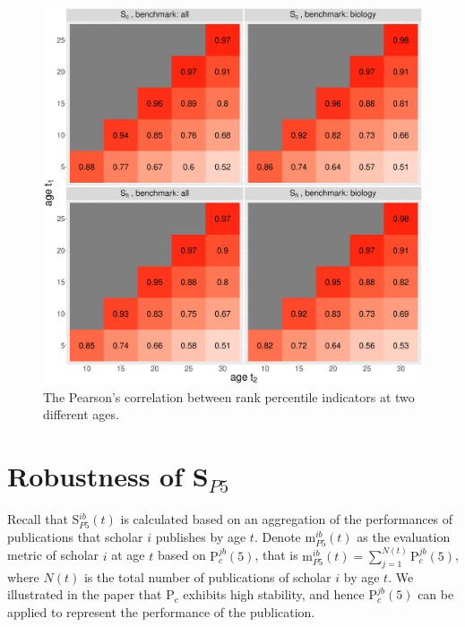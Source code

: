 \begin{refsection}
\begin{figure}[ht!]
    \centering
    \includegraphics[width=\textwidth]{figures/pred_power/suppl_heatmap_cor_current.eps}
    \caption[Correlation heatmap for S$_c$ and S$_h$.]{The Pearson's correlation between rank percentile indicators at two different ages. }
    \label{fig:hm_autrp_current}
\end{figure}



\section{Robustness of \texorpdfstring{S$_{P5}$}{Lg}}
\label{sec:suppl_robustness_P5}

Recall that S$_{P5}^{ib}(t)$ is calculated based on an aggregation of the performances of publications that scholar $i$ publishes by age $t$. Denote $\text{m}_{P5}^{ib}(t)$ as the evaluation metric of scholar $i$ at age $t$ based on $\text{P}_{c}^{jb}(5)$, that is $\text{m}_{P5}^{ib}(t)= \sum_{j=1}^{N(t)} \text{P}_{c}^{jb}(5)$, where $N(t)$ is the total number of publications of scholar $i$ by age $t$. We illustrated in the paper that P$_c$ exhibits high stability, and hence P$_{c}^{jb}(5)$ can be applied to represent the performance of the publication. 


\end{refsection}
